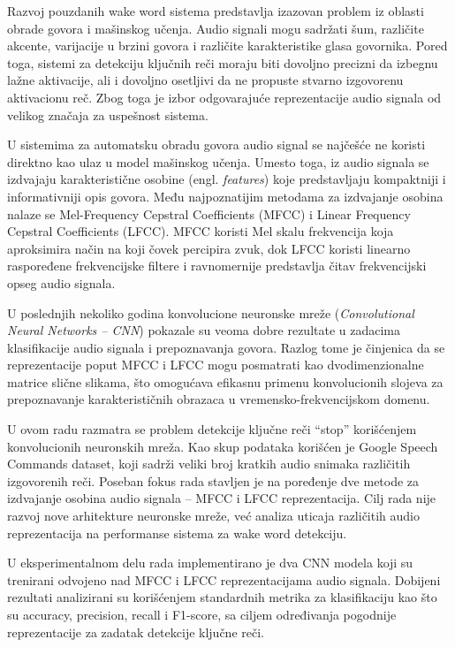 \documentclass[a4paper,12pt]{article}
\begin{document}
Razvoj pouzdanih wake word sistema predstavlja izazovan problem iz oblasti obrade govora i mašinskog učenja. Audio signali mogu sadržati šum, različite akcente, varijacije u brzini govora i različite karakteristike glasa govornika. Pored toga, sistemi za detekciju ključnih reči moraju biti dovoljno precizni da izbegnu lažne aktivacije, ali i dovoljno osetljivi da ne propuste stvarno izgovorenu aktivacionu reč. Zbog toga je izbor odgovarajuće reprezentacije audio signala od velikog značaja za uspešnost sistema.

U sistemima za automatsku obradu govora audio signal se najčešće ne koristi direktno kao ulaz u model mašinskog učenja. Umesto toga, iz audio signala se izdvajaju karakteristične osobine (engl. \textit{features}) koje predstavljaju kompaktniji i informativniji opis govora. Među najpoznatijim metodama za izdvajanje osobina nalaze se Mel-Frequency Cepstral Coefficients (MFCC) i Linear Frequency Cepstral Coefficients (LFCC). MFCC koristi Mel skalu frekvencija koja aproksimira način na koji čovek percipira zvuk, dok LFCC koristi linearno raspoređene frekvencijske filtere i ravnomernije predstavlja čitav frekvencijski opseg audio signala.

U poslednjih nekoliko godina konvolucione neuronske mreže (\textit{Convolutional Neural Networks -- CNN}) pokazale su veoma dobre rezultate u zadacima klasifikacije audio signala i prepoznavanja govora. Razlog tome je činjenica da se reprezentacije poput MFCC i LFCC mogu posmatrati kao dvodimenzionalne matrice slične slikama, što omogućava efikasnu primenu konvolucionih slojeva za prepoznavanje karakterističnih obrazaca u vremensko-frekvencijskom domenu.

U ovom radu razmatra se problem detekcije ključne reči ``stop'' korišćenjem konvolucionih neuronskih mreža. Kao skup podataka korišćen je Google Speech Commands dataset, koji sadrži veliki broj kratkih audio snimaka različitih izgovorenih reči. Poseban fokus rada stavljen je na poređenje dve metode za izdvajanje osobina audio signala -- MFCC i LFCC reprezentacija. Cilj rada nije razvoj nove arhitekture neuronske mreže, već analiza uticaja različitih audio reprezentacija na performanse sistema za wake word detekciju.

U eksperimentalnom delu rada implementirano je dva CNN modela koji su trenirani odvojeno nad MFCC i LFCC reprezentacijama audio signala. Dobijeni rezultati analizirani su korišćenjem standardnih metrika za klasifikaciju kao što su accuracy, precision, recall i F1-score, sa ciljem određivanja pogodnije reprezentacije za zadatak detekcije ključne reči.
\end{document}

